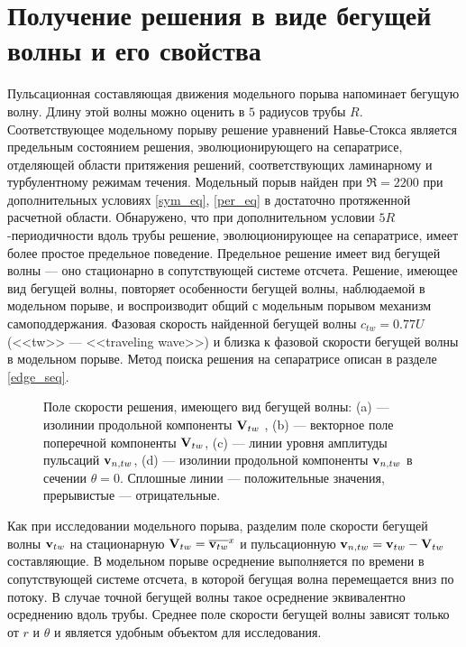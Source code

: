 \section{Получение решения в виде бегущей волны и его свойства}

Пульсационная составляющая движения модельного порыва напоминает бегущую волну. Длину этой волны можно оценить в $5$ радиусов трубы $R$. Соответствующее модельному порыву решение уравнений Навье-Стокса является предельным состоянием решения, эволюционирующего на сепаратрисе, отделяющей области притяжения решений, соответствующих ламинарному и турбулентному режимам течения. Модельный порыв найден при $\Re = 2200$ при дополнительных условиях \eqref{sym_eq}, \eqref{per_eq} в достаточно протяженной расчетной области. Обнаружено, что при дополнительном  условии $5R$-периодичности вдоль трубы решение, эволюционирующее на сепаратрисе, имеет более простое предельное поведение. Предельное решение имеет вид бегущей волны --- оно стационарно в сопутствующей системе отсчета. Решение, имеющее вид бегущей волны, повторяет особенности бегущей волны, наблюдаемой в модельном порыве, и воспроизводит общий с модельным порывом механизм самоподдержания. Фазовая скорость найденной бегущей волны $c_{tw} = 0.77U$ (<<tw>> --- <<traveling wave>>) и близка к фазовой скорости бегущей волны в модельном порыве. Метод поиска решения на сепаратрисе описан в разделе \ref{edge_seq}. 

\begin{figure}
\caption{Поле скорости решения, имеющего вид бегущей волны: (a) --- изолинии продольной компоненты $\mathbf{V}_{tw}$ , (b) --- векторное поле поперечной компоненты $\mathbf{V}_{tw}$, (c) --- линии уровня амплитуды пульсаций $\mathbf{v}_{n,tw}$, (d) --- изолинии продольной компоненты $\mathbf{v}_{n,tw}$ в сечении $\theta = 0$. Сплошные линии --- положительные значения, прерывистые --- отрицательные.}
\label{pipetw_pic}
\end{figure}

Как при исследовании модельного порыва, разделим поле скорости бегущей волны $\mathbf{v}_{tw}$ на стационарную $\mathbf{V}_{tw} = \overline{\mathbf{v}_{tw}}^{x}$ и пульсационную $\mathbf{v}_{n,tw} = \mathbf{v}_{tw} - \mathbf{V}_{tw}$ составляющие. В модельном порыве осреднение выполняется по времени в сопутствующей системе отсчета, в которой бегущая волна перемещается вниз по потоку. В случае точной бегущей волны такое осреднение эквивалентно осреднению вдоль трубы. Среднее поле скорости бегущей волны зависят только от $r$ и $\theta$ и является удобным объектом для исследования. 

